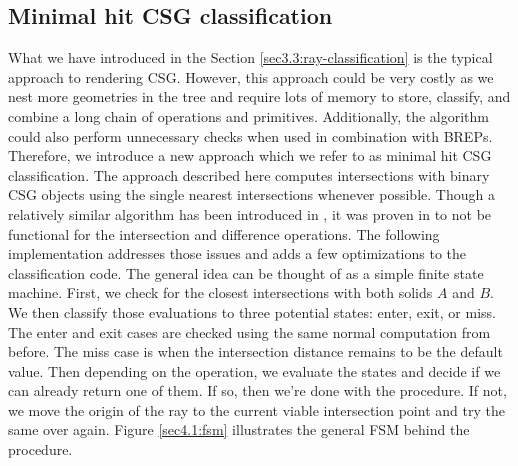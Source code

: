 \documentclass[a4paper,11pt,oneside]{article}
\begin{document}
\subsection{Minimal hit CSG classification}
\label{section:classification-optimization}


What we have introduced in the Section \ref{sec3.3:ray-classification} is the typical approach to rendering CSG. However, this approach could be very costly as we nest more geometries in the tree and require lots of memory to store, classify, and combine a long chain of operations and primitives. Additionally, the algorithm could also perform unnecessary checks when used in combination with BREPs. Therefore, we introduce a new approach which we refer to as minimal hit CSG classification. The approach described here computes intersections with binary CSG objects using the single nearest intersections whenever possible. Though a relatively similar algorithm has been introduced in \cite{kensler_ray_2006}, it was proven in \cite{csg-xrt-renderer} to not be functional for the intersection and difference operations. The following implementation addresses those issues and adds a few optimizations to the classification code. The general idea can be thought of as a simple finite state machine. First, we check for the closest intersections with both solids $A$ and $B$. We then classify those evaluations to three potential states: enter, exit, or miss. The enter and exit cases are checked using the same normal computation from before. The miss case is when the intersection distance remains to be the default value. Then depending on the operation, we evaluate the states and decide if we can already return one of them. If so, then we're done with the procedure. If not, we move the origin of the ray to the current viable intersection point and try the same over again. Figure \ref{sec4.1:fsm} illustrates the general FSM behind the procedure.   
\end{document}
